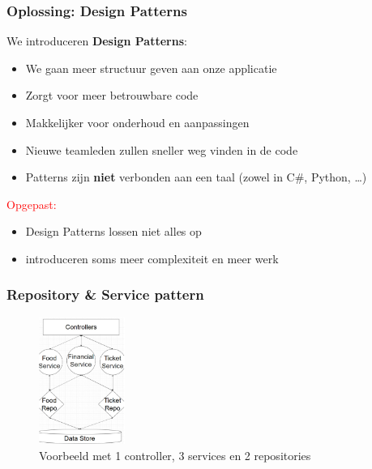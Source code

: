 \documentclass{article}
\begin{document}
\subsubsection{Oplossing: Design Patterns}

We introduceren \textbf{Design Patterns}:

\begin{itemize}
    \item We gaan meer structuur geven aan onze applicatie
    \item Zorgt voor meer betrouwbare code
    \item Makkelijker voor onderhoud en aanpassingen
    \item Nieuwe teamleden zullen sneller weg vinden in de code
    \item Patterns zijn \textbf{niet} verbonden aan een taal (zowel in C\#, Python, \dots)
\end{itemize}

\textcolor{red}{Opgepast:}

\begin{itemize}
    \item Design Patterns lossen niet alles op
    \item introduceren soms meer complexiteit en meer werk
\end{itemize}

\subsubsection{Repository \& Service pattern}

\begin{figure}[H]
    \centering
    \includegraphics[width=0.25\textwidth]{repository-service-pattern.png}
    \caption{Voorbeeld met 1 controller, 3 services en 2 repositories}
\end{figure}
\end{document}
